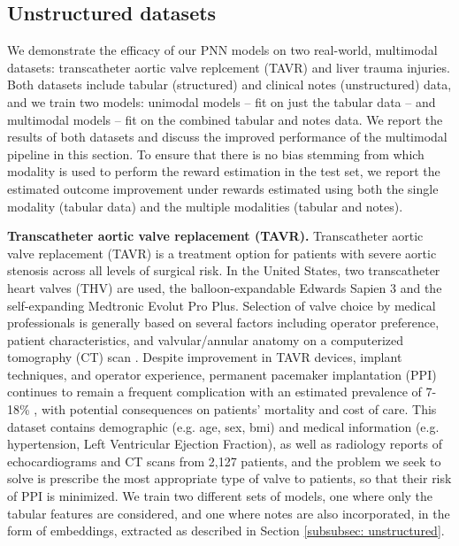 \documentclass[10pt]{article} %
\begin{document}
\subsection{Unstructured datasets} \label{subsec:unstructured}
We demonstrate the efficacy of our PNN models on two real-world, multimodal datasets: transcatheter aortic valve replcement (TAVR) and liver trauma injuries. Both datasets include tabular (structured) and clinical notes (unstructured) data, and we train two models: unimodal models -- fit on just the tabular data -- and multimodal models -- fit on the combined tabular and notes data. We report the results of both datasets and discuss the improved performance of the multimodal pipeline in this section. To ensure that there is no bias stemming from which modality is used to perform the reward estimation in the test set, we report the estimated outcome improvement under rewards estimated using both the single modality (tabular data) and the multiple modalities (tabular and notes). 

\textbf{Transcatheter aortic valve replacement (TAVR).} Transcatheter aortic valve replacement (TAVR) is a treatment option for patients with severe aortic stenosis across all levels of surgical risk. In the United States, two transcatheter heart valves (THV) are used, the balloon-expandable Edwards Sapien 3 and the self-expanding Medtronic Evolut Pro Plus. Selection of valve choice by medical professionals is generally based on several factors including operator preference, patient characteristics, and valvular/annular anatomy on a computerized tomography (CT) scan \citep{Mitsisi2022, leone2023prosthesis}. Despite improvement in TAVR devices, implant techniques, and operator experience, permanent pacemaker implantation (PPI) continues to remain a frequent complication with an estimated prevalence of 7-18\% \citep{Webb2012, smith2011transcatheter}, with potential consequences on patients' mortality and cost of care. This dataset contains demographic (e.g. age, sex, bmi) and medical information (e.g. hypertension, Left Ventricular Ejection Fraction), as well as radiology reports of echocardiograms and CT scans from 2,127 patients, and the problem we seek to solve is prescribe the most appropriate type of valve to patients, so that their risk of PPI is minimized. We train two different sets of models, one where only the tabular features are considered, and one where notes are also incorporated, in the form of embeddings, extracted as described in Section \ref{subsubsec: unstructured}.
\end{document}
